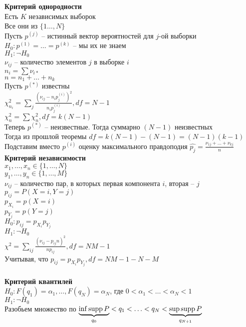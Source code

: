 \documentclass[12pt]{article}
\begin{document}
\textbf{Критерий однородности}\\
Есть $K$ независимых выборок\\
Все они из $\{1\ldots,N\}$\\
Пусть $p^{(j)}$ -- истинный вектор вероятностей для $j$-ой выборки\\
$H_0: p^{(1)} = \ldots = p^{(k)}$ -- мы их не знаем\\
$H_1: \lnot H_0$\\
$\nu_{ij}$ -- количество элементов $j$ в выборке $i$\\
$n_i = \sum \nu_{i*}$\\
$n = n_1 + \ldots + n_k$\\
Пусть $p^{(*)}$ известны\\
$\chi_{n_i}^2 = \sum_j \frac{(\nu_{ij} - n_i p_j^{(i)})^2}{n_i p_j^{(i)}}, df = N - 1$\\
$\chi_n^2 = \sum \chi_n^2, df = k(N-1)$\\
Теперь $p^{(*)}$ -- неизвестные. Тогда суммарно $(N-1)$ неизвестных\\
Тогда из прошлой теоремы $df = k(N-1) - (N-1) = (N-1)(k-1)$\\
Подставим вместо $p^{(i)}$ оценку максимального правдоподия $\widehat{p_j} = \frac{\nu_{1j}+\ldots + \nu_{kj}}{n}$\\
\textbf{Критерий независимости}\\
$x_1, \ldots, x_n \in \{1,\ldots,N\}$\\
$y_1, \ldots, y_n \in \{1,\ldots,M\}$\\
$\nu_{ij}$ -- количество пар, в которых первая компонента $i$, вторая -- $j$\\
$p_{ij} = P(X=i, Y=j)$\\
$p_{X_i} = p(X=i)$\\
$p_{Y_j} = p(Y=j)$\\
$H_0: p_{ij} = p_{X_i}p_{Y_j}$\\
$H_1: \lnot H_0$\\
$\chi^2 = \sum_{ij} \frac{(\nu_{ij} - p_{ij}n)^2}{np_{ij}}, df = NM-1$\\
Учитывая, что $p_{ij} = p_{X_i}p_{Y_j}, df = NM-1-N-M$\\\\
\textbf{Критерий квантилей}\\
$H_0: F(q_1) = \alpha_1, \ldots, F(q_N) = \alpha_N$, где $0 < \alpha_1 < \ldots < \alpha_N < 1$\\
$H_1: \lnot H_0$\\
Разобьем множество по $\ub{q_0}{\inf \supp P} < q_1 < \ldots < q_{N} < \ub{q_{N+1}}{\sup \supp P}$\\
\end{document}
